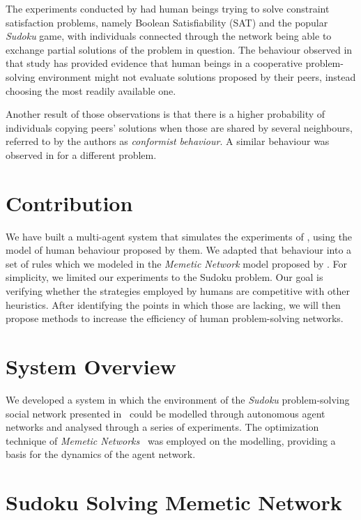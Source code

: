 \documentclass{article}
\begin{document}
The experiments conducted by \cite{farenzena:collabem} had human beings trying to solve constraint satisfaction problems, namely Boolean Satisfiability (SAT) and the popular \emph{Sudoku} game, with individuals connected through the network being able to exchange partial solutions of the problem in question. The behaviour observed in that study has provided evidence that human beings in a cooperative problem-solving environment might not evaluate solutions proposed by their peers, instead choosing the most readily available one.

Another result of those observations is that there is a higher probability of individuals copying peers' solutions when those are shared by several neighbours, referred to by the authors as \emph{conformist behaviour}. A similar behaviour was observed in \cite{mason:collablearnet} for a different problem.

\section{Contribution}

We have built a multi-agent system that simulates the experiments of \cite{farenzena:collabem}, using the model of human behaviour proposed by them. We adapted that behaviour into a set of rules which we modeled in the \emph{Memetic Network} model proposed by \cite{lamb:memenet}. For simplicity, we limited our experiments to the Sudoku problem. Our goal is verifying whether the strategies employed by humans are competitive with other heuristics. After identifying the points in which those are lacking, we will then propose methods to increase the efficiency of human problem-solving networks.

\section{System Overview}

We developed a system in which the environment of the {\em Sudoku} problem-solving social network presented in~\cite{farenzena:collabem} could be modelled through autonomous agent networks and analysed through a series of experiments. The optimization technique of {\em Memetic Networks}~\cite{lamb:memenet} was employed on the modelling, providing a basis for the dynamics of the agent network.

\section{Sudoku Solving Memetic Network}
 
\end{document}

